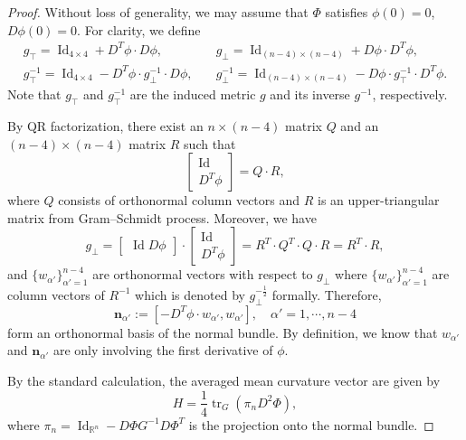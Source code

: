 \documentclass[11pt,letterpaper]{amsart}
\DeclareMathOperator{\Id}{Id}
\DeclareMathOperator{\tr}{tr}
\newcommand{\bR}{\mathbb{R}}
\theoremstyle{definition}
\theoremstyle{remark}
\numberwithin{equation}{section}
\begin{document}
\begin{proof}
Without loss of generality, we may assume that $\Phi$ satisfies $\phi(0)=0$, $D\phi(0)=0$. For clarity, we define
\begin{equation*}
\begin{split}
    g_{\top}=\Id_{4\times 4}+D^{T}\phi\cdot D\phi,\quad &g_{\bot}=\Id_{(n-4)\times (n-4)}+D\phi \cdot D^{T}\phi,\\
    g^{-1}_{\top}=\Id_{4\times 4}-D^{T}\phi\cdot g_{\bot}^{-1}\cdot D\phi, \quad &g_{\bot}^{-1}=\Id_{(n-4)\times (n-4)}-D\phi \cdot g^{-1}_{\top}\cdot D^{T}\phi.
    \end{split}
\end{equation*}
Note that $g_{\top}$ and $g^{-1}_{\top}$ are the induced metric $g$ and its inverse $g^{-1}$, respectively.

By QR factorization, there exist an $n\times (n-4)$ matrix $Q$ and an $(n-4)\times (n-4)$ matrix $R$ such that 
\begin{equation*}
    \begin{bmatrix}
        \Id \\
        D^{T}\phi
    \end{bmatrix}=Q\cdot R,
\end{equation*}
where $Q$ consists of orthonormal column vectors and $R$ is an upper-triangular matrix from Gram--Schmidt process. Moreover, we have 
\begin{equation*}
    g_{\bot}=\begin{bmatrix}
        \Id D\phi
    \end{bmatrix} \cdot
    \begin{bmatrix}
        \Id \\
        D^{T}\phi
    \end{bmatrix}=R^{T}\cdot Q^{T}\cdot Q\cdot R=R^{T}\cdot R,
\end{equation*}
and $\{w_{\alpha'}\}_{\alpha'=1}^{n-4}$ are orthonormal vectors with respect to $g_{\bot}$ where $\{w_{\alpha'}\}_{\alpha'=1}^{n-4}$ are column vectors of $R^{-1}$ which is denoted by $g_{\bot}^{-\frac{1}{2}}$ formally. Therefore, 
\begin{equation*}
    \boldsymbol{n}_{\alpha'}:=\left[-D^{T}\phi\cdot w_{\alpha'}, w_{\alpha'}\right], \quad \alpha'=1, \cdots, n-4
\end{equation*}
form an orthonormal basis of the normal bundle. By definition, we know that $w_{\alpha'}$ and $\boldsymbol{n}_{\alpha'}$ are only involving the first derivative of $\phi$. 

By the standard calculation, the averaged mean curvature vector are given by 
\begin{equation}\label{H on graph}
    H=\frac{1}{4} \tr_{G}\left(\pi_{n} D^2 \Phi\right),
\end{equation}
where $\pi_{n}=\Id_{\bR^n}-D \Phi G^{-1} D\Phi^{T}$ is the projection onto the normal bundle.


\end{proof}
\end{document}
